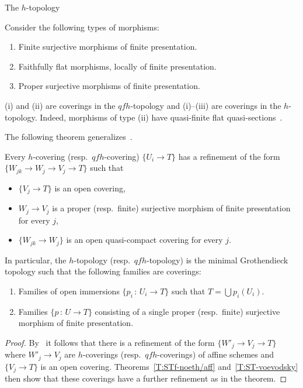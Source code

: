 \documentclass[a4paper,twoside,11pt]{amsart}[2009/07/02] %
\newcommand{\pref}[1]{\eqref{#1}}
\newcommand{\map}[3]{#1\,:\, #2\rightarrow #3}
\begin{document}
\begin{section}{The $h$-topology}
\begin{remark}
Consider the following types of morphisms:
%
\begin{enumerate}
\item Finite surjective morphisms of finite presentation.
\item Faithfully flat morphisms, locally of finite presentation.
\item Proper surjective morphisms of finite presentation.
\end{enumerate}
%
(i) and (ii) are coverings in the $qfh$-topology and (i)--(iii) are coverings
in the $h$-topology. Indeed, morphisms of type (ii) have quasi-finite
flat quasi-sections~\cite[Cor.~17.16.2]{egaIV}.
\end{remark}

The following theorem generalizes~\cite[Thm.~3.1.9]{voevodsky_homology}.

\begin{theorem}\label{T:h-top-desc}
Every $h$-covering (resp.\ $qfh$-covering) $\{U_i\to T\}$ has a refinement of
the form $\{W_{jk}\to W_j \to V_j\to T\}$ such that
%
\begin{itemize}
\item $\{V_{j}\to T\}$ is an open covering,
\item $W_j\to V_j$ is a proper (resp.\ finite) surjective morphism of finite
presentation for every $j$,
\item $\{W_{jk}\to W_j\}$ is an open quasi-compact covering for every $j$.
\end{itemize}
In particular, the $h$-topology (resp.\ $qfh$-topology) is the minimal
Grothen\-dieck topology such that the following families are coverings:
%
\begin{enumerate}
\item Families of open immersions $\{\map{p_i}{U_i}{T}\}$
such that $T=\bigcup p_i(U_i)$.
\item Families $\{\map{p}{U}{T}\}$ consisting of a single proper
(resp.\ finite) surjective morphism of finite presentation.
\end{enumerate}
\end{theorem}
\begin{proof}
By~\cite[Exp.~IV, Prop.~6.2.1]{sga3}
%
it follows that there is a refinement of the form $\{W'_j\to V_j\to T\}$ where
$W'_j\to V_j$ are $h$-coverings (resp.\ $qfh$-coverings) of affine schemes and
$\{V_j\to T\}$ is an open covering. Theorems~\pref{T:STf-noeth/aff}
and~\pref{T:ST-voevodsky} then show that these coverings have a further
refinement as in the theorem.
\end{proof}



\end{section}
\end{document}
